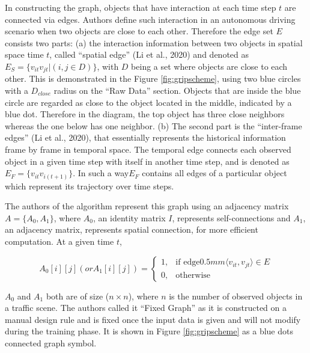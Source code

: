 \tab In constructing the graph, objects that have interaction at each time step \(t\) are connected via edges. Authors define such interaction in an autonomous driving scenario when two objects are close to each other. Therefore the edge set \(E\) consists two parts: (a) the interaction information between two objects in spatial space time \(t\), called “spatial edge” (Li et al., 2020) and denoted as \(E_S = \{v_{it}v_{jt}|(i,j \in D)\}\), with \(D\) being a set where objects are close to each other. This is demonstrated in the Figure \ref{fig:gripscheme}, using two blue circles with a \(D_{close}\) radius on the “Raw Data” section. Objects that are inside the blue circle are regarded as close to the object located in the middle, indicated by a blue dot. Therefore in the diagram, the top object has three close neighbors whereas the one below has one neighbor. (b) The second part is the “inter-frame edges” (Li et al., 2020), that essentially represents the historical information frame by frame in temporal space. The temporal edge connects each observed object in a given time step with itself in another time step, and is denoted as \(E_F = \{v_{it}v_{i(t+1)}\}\). In such a way\(E_F\) contains all edges of a particular object which represent its trajectory over time steps. 

\tab The authors of the algorithm represent this graph using an adjacency matrix \(A = \{A_0, A_1\}\),  where \(A_0\), an identity matrix \(I\), represents self-connections and \(A_1\), an adjacency matrix, represents spatial connection, for more efficient computation. At a given time \(t\),


\begin{equation}
    A_0[i][j] (or A_1[i][j]) = 
    \begin{cases}
        1, & \text{if edge} {0.5mm} \langle v_{it}, v_{jt}\rangle  \in E\\
        0, & \text{otherwise}
    \end{cases}
\end{equation}

\(A_0\) and \(A_1\) both are of size (\(n \times n\)), where \(n\) is the number of observed objects in a traffic scene. The authors called it “Fixed Graph” as  it is constructed on a manual design rule and is fixed once the input data is given and will not modify during the training phase. It is shown in Figure \ref{fig:gripscheme} as a blue dots connected graph symbol. 

